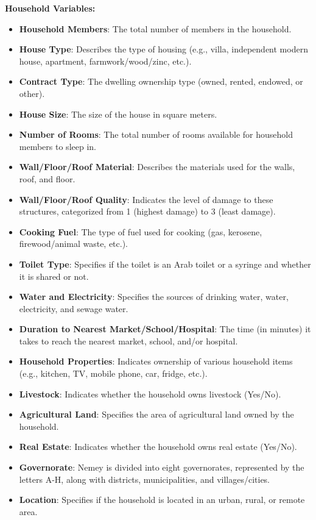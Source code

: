 \documentclass[
]{article}
\begin{document}
\textbf{Household Variables:}

\begin{itemize}
\item
  \textbf{Household Members}: The total number of members in the
  household.
\item
  \textbf{House Type}: Describes the type of housing (e.g., villa,
  independent modern house, apartment, farmwork/wood/zinc, etc.).
\item
  \textbf{Contract Type}: The dwelling ownership type (owned, rented,
  endowed, or other).
\item
  \textbf{House Size}: The size of the house in square meters.
\item
  \textbf{Number of Rooms}: The total number of rooms available for
  household members to sleep in.
\item
  \textbf{Wall/Floor/Roof Material}: Describes the materials used for
  the walls, roof, and floor.
\item
  \textbf{Wall/Floor/Roof Quality}: Indicates the level of damage to
  these structures, categorized from 1 (highest damage) to 3 (least
  damage).
\item
  \textbf{Cooking Fuel}: The type of fuel used for cooking (gas,
  kerosene, firewood/animal waste, etc.).
\item
  \textbf{Toilet Type}: Specifies if the toilet is an Arab toilet or a
  syringe and whether it is shared or not.
\item
  \textbf{Water and Electricity}: Specifies the sources of drinking
  water, water, electricity, and sewage water.
\item
  \textbf{Duration to Nearest Market/School/Hospital}: The time (in
  minutes) it takes to reach the nearest market, school, and/or
  hospital.
\item
  \textbf{Household Properties}: Indicates ownership of various
  household items (e.g., kitchen, TV, mobile phone, car, fridge, etc.).
\item
  \textbf{Livestock}: Indicates whether the household owns livestock
  (Yes/No).
\item
  \textbf{Agricultural Land}: Specifies the area of agricultural land
  owned by the household.
\item
  \textbf{Real Estate}: Indicates whether the household owns real estate
  (Yes/No).
\item
  \textbf{Governorate}: Nemey is divided into eight governorates,
  represented by the letters A-H, along with districts, municipalities,
  and villages/cities.
\item
  \textbf{Location}: Specifies if the household is located in an urban,
  rural, or remote area.
\end{itemize}
\end{document}
